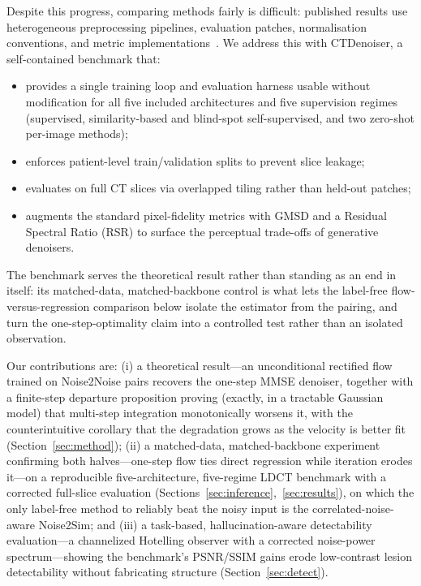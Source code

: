 \documentclass[letterpaper]{article} %
\begin{document}
Despite this progress, comparing methods fairly is difficult: published
results use heterogeneous preprocessing pipelines, evaluation patches,
normalisation conventions, and metric implementations~\cite{eulig2024benchmark}.
We address this with CTDenoiser, a self-contained benchmark that:

\begin{itemize}
  \item provides a single training loop and evaluation harness usable
        without modification for all five included architectures and five
        supervision regimes (supervised, similarity-based and blind-spot
        self-supervised, and two zero-shot per-image methods);
  \item enforces patient-level train/validation splits to prevent slice
        leakage;
  \item evaluates on full CT slices via overlapped tiling rather than
        held-out patches;
  \item augments the standard pixel-fidelity metrics with GMSD and
        a Residual Spectral Ratio (RSR) to surface the perceptual
        trade-offs of generative denoisers.
\end{itemize}

The benchmark serves the theoretical result rather than standing as an end in
itself: its matched-data, matched-backbone control is what lets the
label-free flow-versus-regression comparison below isolate the estimator
from the pairing, and turn the one-step-optimality claim into a controlled
test rather than an isolated observation.

Our contributions are: (i) a theoretical result---an unconditional rectified
flow trained on Noise2Noise pairs recovers the one-step MMSE denoiser, together
with a finite-step departure proposition proving (exactly, in a tractable
Gaussian model) that multi-step integration monotonically worsens it, with the
counterintuitive corollary that the degradation grows as the velocity is
better fit (Section~\ref{sec:method}); (ii) a matched-data,
matched-backbone experiment confirming both halves---one-step flow ties direct
regression while iteration erodes it---on a reproducible five-architecture,
five-regime LDCT benchmark with a corrected full-slice evaluation
(Sections~\ref{sec:inference},~\ref{sec:results}), on which the only label-free
method to reliably beat the noisy input is the correlated-noise-aware Noise2Sim;
and (iii) a task-based, hallucination-aware detectability evaluation---a
channelized Hotelling observer with a corrected noise-power spectrum---showing the
benchmark's PSNR/SSIM gains erode low-contrast lesion detectability without
fabricating structure (Section~\ref{sec:detect}).
\end{document}
